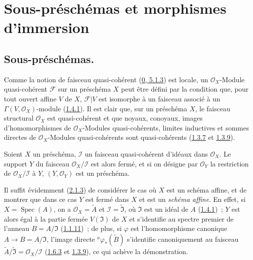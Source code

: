 \section{Sous-préschémas et morphismes d'immersion}
\label{section:I.4-fr}

\subsection{Sous-préschémas.}
\label{subsection:I.4.1-fr}

\begin{env}[4.1.1]
\label{I.4.1.1-fr}
Comme la notion de faisceau quasi-cohérent
(\hyperref[0.5.1.3-fr]{0, 5.1.3}) est locale, un
$\mathscr{O}_X$-Module quasi-cohérent $\mathscr{F}$ sur un préschéma $X$ peut
être défini par la condition que, pour tout ouvert affine $V$ de $X$,
$\mathscr{F}|V$ est isomorphe à un faisceau associé à un
$\Gamma(V,\mathscr{O}_X)$-module (\hyperref[I.1.4.1-fr]{1.4.1}). Il est clair
que, sur un préschéma $X$, le faisceau structural $\mathscr{O}_X$ est
quasi-cohérent et que noyaux, conoyaux, images d'homomorphismes de
$\mathscr{O}_X$-Modules quasi-cohérents, limites inductives et sommes directes
de $\mathscr{O}_X$-Modules quasi-cohérents sont quasi-cohérents
(\hyperref[I.1.3.7-fr]{1.3.7} et \hyperref[I.1.3.9-fr]{1.3.9}).
\end{env}

\begin{proposition}[4.1.2]
\label{I.4.1.2-fr}
Soient $X$ un préschéma, $\mathscr{I}$ un faisceau quasi-cohérent d'idéaux
dans $\mathscr{O}_X$. Le support $Y$ du faisceau
$\mathscr{O}_X/\mathscr{I}$ est alors fermé, et si on désigne par
$\mathscr{O}_Y$ la restriction de $\mathscr{O}_X/\mathscr{I}$ à $Y$,
$(Y,\mathscr{O}_Y)$ est un préschéma.
\end{proposition}

Il suffit évidemment (\hyperref[I.2.1.3-fr]{2.1.3}) de considérer le cas où
$X$ est un schéma affine, et de montrer que dans ce cas $Y$ est fermé dans
$X$ et est un \emph{schéma affine}. En effet, si
$X=\operatorname{Spec}(A)$, on a $\mathscr{O}_X=\widetilde{A}$ et
$\mathscr{I}=\widetilde{\mathfrak{I}}$, où $\mathfrak{I}$ est un idéal de
$A$ (\hyperref[I.1.4.1-fr]{1.4.1})~; $Y$ est alors égal à la partie fermée
$V(\mathfrak{I})$ de $X$ et s'identifie au spectre premier de l'anneau
$B=A/\mathfrak{I}$ (\hyperref[I.1.1.11-fr]{1.1.11})~; de plus, si $\varphi$
est l'homomorphisme canonique $A\to B=A/\mathfrak{I}$, l'image directe
${}^a\varphi_*(\widetilde{B})$ s'identifie canoniquement au faisceau
$\widetilde{A}/\widetilde{\mathfrak{I}}=\mathscr{O}_X/\mathscr{I}$
(\hyperref[I.1.6.3-fr]{1.6.3} et \hyperref[I.1.3.9-fr]{1.3.9}), ce qui achève
la démonstration.

